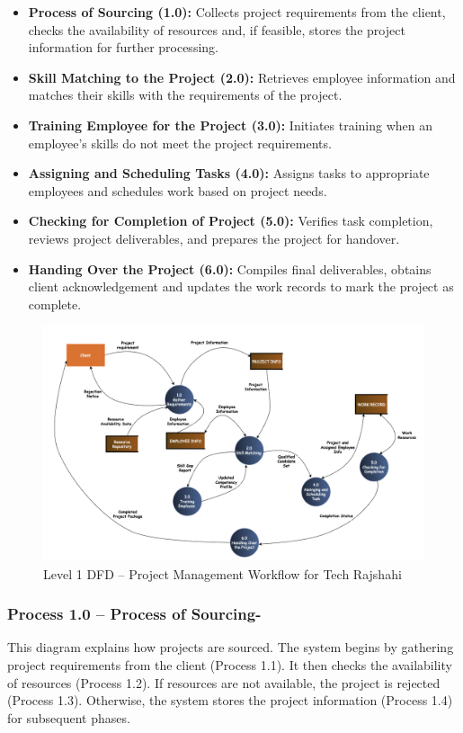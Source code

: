 \documentclass[12pt,a4paper]{article}
\begin{document}
\begin{itemize}
    \item \textbf{Process of Sourcing (1.0):} Collects project requirements from the client, checks the availability of resources and, if feasible, stores the project information for further processing.
    \item \textbf{Skill Matching to the Project (2.0):} Retrieves employee information and matches their skills with the requirements of the project.
    \item \textbf{Training Employee for the Project (3.0):} Initiates training when an employee’s skills do not meet the project requirements.
    \item \textbf{Assigning and Scheduling Tasks (4.0):} Assigns tasks to appropriate employees and schedules work based on project needs.
    \item \textbf{Checking for Completion of Project (5.0):} Verifies task completion, reviews project deliverables, and prepares the project for handover.
    \item \textbf{Handing Over the Project (6.0):} Compiles final deliverables, obtains client acknowledgement and updates the work records to mark the project as complete.
\end{itemize}

\begin{figure}[H]
    \centering
    \includegraphics[width=\textwidth]{Fig/level1_dfd.png}
    \caption{Level 1 DFD – Project Management Workflow for Tech Rajshahi}
    \label{fig:level1_dfd}
\end{figure}

\vspace{1.5em}
\subsubsection*{Process 1.0 – Process of Sourcing-}
\noindent
This diagram explains how projects are sourced. The system begins by gathering project requirements from the client (Process 1.1). It then checks the availability of resources (Process 1.2). If resources are not available, the project is rejected (Process 1.3). Otherwise, the system stores the project information (Process 1.4) for subsequent phases.
\end{document}
